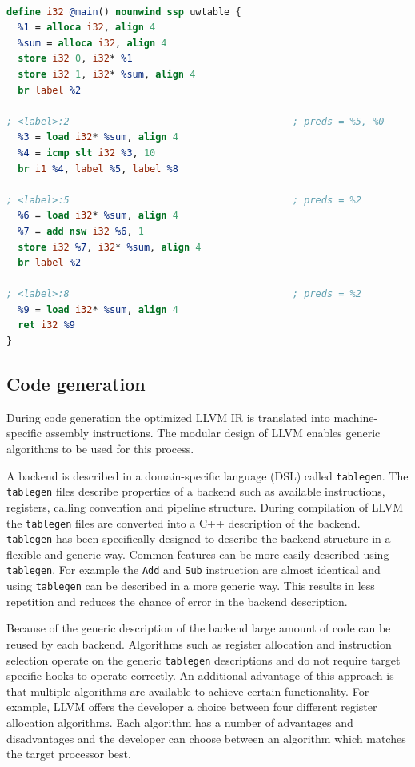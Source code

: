 \lstset{numbers=none, captionpos=b}
\begin{lstlisting}[language=llvm,caption={LLVM Intermediate representation},label=lst:LLVM_IR]

define i32 @main() nounwind ssp uwtable {
  %1 = alloca i32, align 4
  %sum = alloca i32, align 4
  store i32 0, i32* %1
  store i32 1, i32* %sum, align 4
  br label %2

; <label>:2                                       ; preds = %5, %0
  %3 = load i32* %sum, align 4
  %4 = icmp slt i32 %3, 10
  br i1 %4, label %5, label %8

; <label>:5                                       ; preds = %2
  %6 = load i32* %sum, align 4
  %7 = add nsw i32 %6, 1
  store i32 %7, i32* %sum, align 4
  br label %2

; <label>:8                                       ; preds = %2
  %9 = load i32* %sum, align 4
  ret i32 %9
}

\end{lstlisting}

\subsection{Code generation}
During code generation the optimized LLVM IR is translated into machine-specific assembly instructions. The modular design of LLVM enables generic algorithms to be used for this process. 

A backend is described in a domain-specific language (DSL) called \texttt{tablegen}. The \texttt{tablegen} files describe properties of a backend such as available instructions, registers, calling convention and pipeline structure. During compilation of LLVM the \texttt{tablegen} files are converted into a C++ description of the backend. \texttt{tablegen} has been specifically designed to describe the backend structure in a flexible and generic way. Common features can be more easily described using \texttt{tablegen}. For example the \texttt{Add} and \texttt{Sub} instruction are almost identical and using \texttt{tablegen} can be described in a more generic way. This results in less repetition and reduces the chance of error in the backend description.

Because of the generic description of the backend large amount of code can be reused by each backend. Algorithms such as register allocation and instruction selection operate on the generic \texttt{tablegen} descriptions and do not require target specific hooks to operate correctly. An additional advantage of this approach is that multiple algorithms are available to achieve certain functionality. For example, LLVM offers the developer a choice between four different register allocation algorithms. Each algorithm has a number of advantages and disadvantages and the developer can choose between an algorithm which matches the target processor best.


